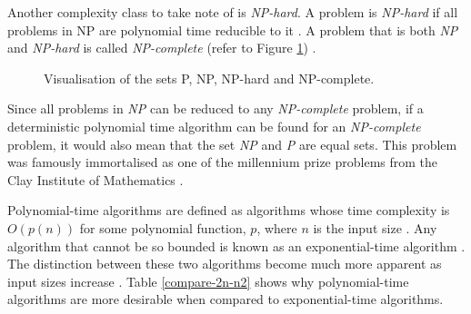 \documentclass[a4paper, 12pt]{extreport}
\begin{document}
				Another complexity class to take note of is \textit{NP-hard}. A problem is \textit{NP-hard} if all problems in NP are polynomial time reducible to it \cite{sipser-intro-to-computation}. A problem that is both \textit{NP} and \textit{NP-hard} is called \textit{NP-complete} (refer to Figure \ref{fig:p,np,npcomplete}) \cite{npcompleteness}.
				
				\begin{figure}
					\centering
					\caption{\centering Visualisation of the sets P, NP, NP-hard and NP-complete.}
					\label{fig:p,np,npcomplete}
				\end{figure}
				
				Since all problems in \textit{NP} can be reduced to any \textit{NP-complete} problem, if a deterministic polynomial time algorithm can be found for an \textit{NP-complete} problem, it would also mean that the set \textit{NP} and \textit{P} are equal sets. This problem was famously immortalised as one of the millennium prize problems from the Clay Institute of Mathematics \cite{claymathMillenniumPrize}.
				
				Polynomial-time algorithms are defined as algorithms whose time complexity is $O(p(n))$ for some polynomial function, $p$, where $n$ is the input size \cite{computers-and-intractability}. Any algorithm that cannot be so bounded is known as an exponential-time algorithm \cite{computers-and-intractability}. The distinction between these two algorithms become much more apparent as input sizes increase \cite{computers-and-intractability}. Table \ref{compare-2n-n2} shows why polynomial-time algorithms are more desirable when compared to exponential-time algorithms.
				
\end{document}
